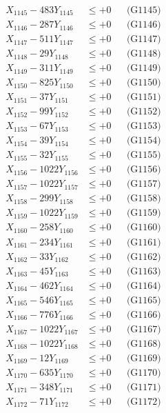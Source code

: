 \documentclass[a4paper,10pt]{article}
\begin{document}
{\begin{align}
X_{1145} - 483Y_{1145} &\leq +0 && \text{(G1145)} \\
X_{1146} - 287Y_{1146} &\leq +0 && \text{(G1146)} \\
X_{1147} - 511Y_{1147} &\leq +0 && \text{(G1147)} \\
X_{1148} - 29Y_{1148} &\leq +0 && \text{(G1148)} \\
X_{1149} - 311Y_{1149} &\leq +0 && \text{(G1149)} \\
X_{1150} - 825Y_{1150} &\leq +0 && \text{(G1150)} \\
\allowbreak
X_{1151} - 37Y_{1151} &\leq +0 && \text{(G1151)} \\
X_{1152} - 99Y_{1152} &\leq +0 && \text{(G1152)} \\
X_{1153} - 67Y_{1153} &\leq +0 && \text{(G1153)} \\
X_{1154} - 39Y_{1154} &\leq +0 && \text{(G1154)} \\
X_{1155} - 32Y_{1155} &\leq +0 && \text{(G1155)} \\
X_{1156} - 1022Y_{1156} &\leq +0 && \text{(G1156)} \\
X_{1157} - 1022Y_{1157} &\leq +0 && \text{(G1157)} \\
X_{1158} - 299Y_{1158} &\leq +0 && \text{(G1158)} \\
X_{1159} - 1022Y_{1159} &\leq +0 && \text{(G1159)} \\
X_{1160} - 258Y_{1160} &\leq +0 && \text{(G1160)} \\
\allowbreak
X_{1161} - 234Y_{1161} &\leq +0 && \text{(G1161)} \\
X_{1162} - 33Y_{1162} &\leq +0 && \text{(G1162)} \\
X_{1163} - 45Y_{1163} &\leq +0 && \text{(G1163)} \\
X_{1164} - 462Y_{1164} &\leq +0 && \text{(G1164)} \\
X_{1165} - 546Y_{1165} &\leq +0 && \text{(G1165)} \\
X_{1166} - 776Y_{1166} &\leq +0 && \text{(G1166)} \\
X_{1167} - 1022Y_{1167} &\leq +0 && \text{(G1167)} \\
X_{1168} - 1022Y_{1168} &\leq +0 && \text{(G1168)} \\
X_{1169} - 12Y_{1169} &\leq +0 && \text{(G1169)} \\
X_{1170} - 635Y_{1170} &\leq +0 && \text{(G1170)} \\
\allowbreak
X_{1171} - 348Y_{1171} &\leq +0 && \text{(G1171)} \\
X_{1172} - 71Y_{1172} &\leq +0 && \text{(G1172)} \\

\end{align}}
\end{document}
